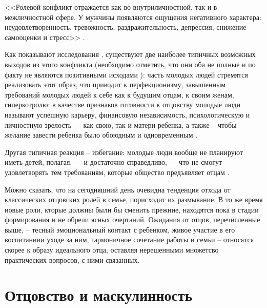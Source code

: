 \documentclass{../../common/thesisbyxetex}
\begin{document}
<<Ролевой конфликт отражается как во внутриличностной, так и в межличностной
сфере. У мужчины появляются ощущения негативного характера: неудовлетворенность,
тревожность, раздражительность, депрессия, снижение самооценки и стресс>> \cite[113]{confl}.

Как показывают исследования \cite{imaf}, существуют две наиболее типичных возможных выходов
из этого конфликта (необходимо отметить, что они оба не полные и по факту не являются позитивными
исходами ): часть молодых людей
стремятся реализовать этот образ, что приводит к перфекционизму, завышенным требований молодых
людей к себе как к будущим отцам, к своим женам, гиперкотролю: в качестве признаков
готовности к отцовству молодые люди называют успешную карьеру, финансовую независимость,
психологическую и личностную зрелость --- как свою, так и матери ребенка, а также -- чтобы желание
завести ребенка было обоюдным и одновременным \cite{imaf}.

Другая типичная  реакция -- избегание: молодые люди вообще не планируют иметь детей, полагая, --- и
достаточно справедливо, --- что не смогут удовлетворять
тем требованиям, которые общество предъявляет отцам \cite{imaf}.

Можно сказать, что на сегодняшний день очевидна тенденция отхода от классических отцовских ролей в
семье, порисходит их размывание. В то же время новые роли, кторые должны были бы сменить прежние,
находятся пока в стадии формирования  и не обрели ясных очертаний. Ожидания от отцов, перечисленные
выше, -- тесный эмоциональный контакт с ребенком, живое участие в его воспитаниии уходе за ним,
гармоничное сочетание работы и семьи -- относятся скорее к образу идеального отца, оставляя
нерешенными множетсво практических вопросов, с ними связанных.



\section{Отцовство и маскулинность}
\end{document}
